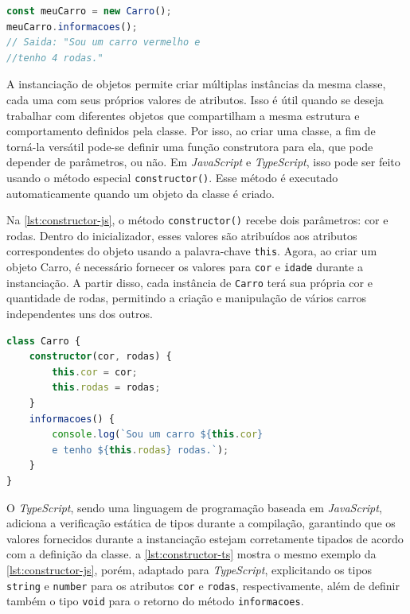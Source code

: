 \begin{lstlisting}[language=TypeScript, caption=Instanciação de objetos em JS e TS., label=lst:instanciacao]
const meuCarro = new Carro();
meuCarro.informacoes();
// Saida: "Sou um carro vermelho e 
//tenho 4 rodas."
\end{lstlisting}


A instanciação de objetos permite criar múltiplas instâncias da mesma classe, cada uma com seus próprios valores de atributos. Isso é útil quando se deseja trabalhar com diferentes objetos que compartilham a mesma estrutura e comportamento definidos pela classe. Por isso, ao criar uma classe, a fim de torná-la versátil pode-se definir uma função construtora para ela, que pode depender de parâmetros, ou não. Em \textit{JavaScript} e \textit{TypeScript}, isso pode ser feito usando o método especial \texttt{constructor()}. Esse método é executado automaticamente quando um objeto da classe é criado.



Na \autoref{lst:constructor-js}, o método \texttt{constructor()} recebe dois parâmetros: cor e rodas. Dentro do inicializador, esses valores são atribuídos aos atributos correspondentes do objeto usando a palavra-chave \texttt{this}. Agora, ao criar um objeto Carro, é necessário fornecer os valores para \texttt{cor} e \texttt{idade} durante a instanciação. A partir disso, cada instância de \texttt{Carro} terá sua própria cor e quantidade de rodas, permitindo a criação e manipulação de vários carros independentes uns dos outros.


\begin{lstlisting}[language=TypeScript, caption=Adicionando inicializador de objetos em JS., label=lst:constructor-js]
class Carro {
    constructor(cor, rodas) {
        this.cor = cor;
        this.rodas = rodas;
    }
    informacoes() {
        console.log(`Sou um carro ${this.cor}
        e tenho ${this.rodas} rodas.`);
    }
}
\end{lstlisting}



O \textit{TypeScript}, sendo uma linguagem de programação baseada em \textit{JavaScript}, adiciona a verificação estática de tipos durante a compilação, garantindo que os valores fornecidos durante a instanciação estejam corretamente tipados de acordo com a definição da classe. a \autoref{lst:constructor-ts} mostra o mesmo exemplo da \autoref{lst:constructor-js}, porém, adaptado para \textit{TypeScript}, explicitando os tipos \texttt{string} e \texttt{number} para os atributos \texttt{cor} e \texttt{rodas}, respectivamente, além de definir também o tipo \texttt{void} para o retorno do método \texttt{informacoes}.


